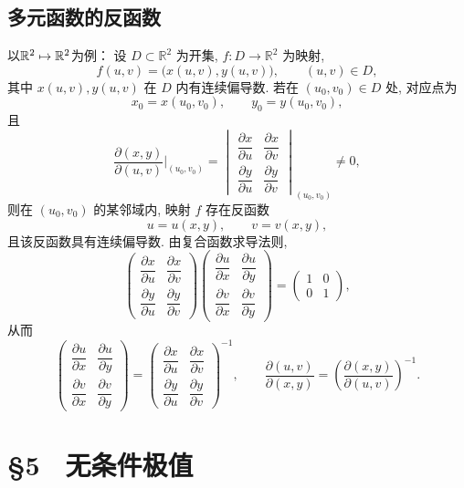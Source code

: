 \subsection*{多元函数的反函数}
以$\mathbb{R}^2 \mapsto \mathbb{R}^2$为例：
设 $D\subset\mathbb{R}^2$ 为开集, $f:D\to\mathbb{R}^2$ 为映射,
\[
f(u,v)=\bigl(x(u,v),y(u,v)\bigr),
\qquad (u,v)\in D,
\]
其中 $x(u,v),y(u,v)$ 在 $D$ 内有连续偏导数. 若在
$(u_0,v_0)\in D$ 处, 对应点为
\[
x_0=x(u_0,v_0),\qquad y_0=y(u_0,v_0),
\]
且
\[
\frac{\partial(x,y)}{\partial(u,v)}\bigg|_{(u_0,v_0)}
=\begin{vmatrix}
\dfrac{\partial x}{\partial u}&\dfrac{\partial x}{\partial v}\\[4pt]
\dfrac{\partial y}{\partial u}&\dfrac{\partial y}{\partial v}
\end{vmatrix}_{(u_0,v_0)}\ne0,
\]
则在 $(u_0,v_0)$ 的某邻域内, 映射 $f$ 存在反函数
\[
u=u(x,y),\qquad v=v(x,y),
\]
且该反函数具有连续偏导数. 由复合函数求导法则,
\[
\begin{pmatrix}
\dfrac{\partial x}{\partial u}&\dfrac{\partial x}{\partial v}\\[5pt]
\dfrac{\partial y}{\partial u}&\dfrac{\partial y}{\partial v}
\end{pmatrix}
\begin{pmatrix}
\dfrac{\partial u}{\partial x}&\dfrac{\partial u}{\partial y}\\[5pt]
\dfrac{\partial v}{\partial x}&\dfrac{\partial v}{\partial y}
\end{pmatrix}
=\begin{pmatrix}1&0\\0&1\end{pmatrix},
\]
从而
\[
\begin{pmatrix}
\dfrac{\partial u}{\partial x}&\dfrac{\partial u}{\partial y}\\[5pt]
\dfrac{\partial v}{\partial x}&\dfrac{\partial v}{\partial y}
\end{pmatrix}
=\begin{pmatrix}
\dfrac{\partial x}{\partial u}&\dfrac{\partial x}{\partial v}\\[5pt]
\dfrac{\partial y}{\partial u}&\dfrac{\partial y}{\partial v}
\end{pmatrix}^{-1},
\qquad
\frac{\partial(u,v)}{\partial(x,y)}
=\left(\frac{\partial(x,y)}{\partial(u,v)}\right)^{-1}.
\]







\section*{§5　无条件极值}



